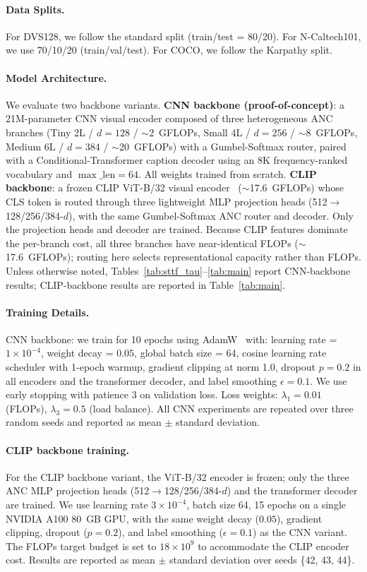 \documentclass{article}
\begin{document}
\paragraph{Data Splits.}
For DVS128, we follow the standard split (train/test = 80/20).
For N-Caltech101, we use 70/10/20 (train/val/test).
For COCO, we follow the Karpathy split.

\paragraph{Model Architecture.}
We evaluate two backbone variants.
\textbf{CNN backbone (proof-of-concept)}: a 21M-parameter CNN visual encoder composed of three heterogeneous ANC branches (Tiny 2L / $d{=}128$ / $\sim$2~GFLOPs, Small 4L / $d{=}256$ / $\sim$8~GFLOPs, Medium 6L / $d{=}384$ / $\sim$20~GFLOPs) with a Gumbel-Softmax router, paired with a Conditional-Transformer caption decoder using an 8K frequency-ranked vocabulary and $\max\_{\text{len}}{=}64$. All weights trained from scratch.
\textbf{CLIP backbone}: a frozen CLIP ViT-B/32 visual encoder~\cite{radford2021clip} ($\sim$17.6~GFLOPs) whose CLS token is routed through three lightweight MLP projection heads (512$\to$128/256/384-$d$), with the same Gumbel-Softmax ANC router and decoder. Only the projection heads and decoder are trained. Because CLIP features dominate the per-branch cost, all three branches have near-identical FLOPs ($\sim$17.6~GFLOPs); routing here selects representational capacity rather than FLOPs. Unless otherwise noted, Tables~\ref{tab:sttf_tau}--\ref{tab:main} report CNN-backbone results; CLIP-backbone results are reported in Table~\ref{tab:main}.

\paragraph{Training Details.}
CNN backbone: we train for 10 epochs using AdamW~\cite{loshchilov2019adamw} with:
learning rate = $1 \times 10^{-4}$,
weight decay = $0.05$,
global batch size = 64,
cosine learning rate scheduler with 1-epoch warmup,
gradient clipping at norm 1.0,
dropout $p=0.2$ in all encoders and the transformer decoder,
and label smoothing $\epsilon=0.1$.
We use early stopping with patience 3 on validation loss.
Loss weights: $\lambda_1=0.01$ (FLOPs), $\lambda_3=0.5$ (load balance).
All CNN experiments are repeated over three random seeds and reported as mean $\pm$ standard deviation.

\paragraph{CLIP backbone training.}
For the CLIP backbone variant, the ViT-B/32 encoder is frozen; only the three ANC MLP projection heads (512$\to$128/256/384-$d$) and the transformer decoder are trained. We use learning rate $3\times10^{-4}$, batch size 64, 15 epochs on a single NVIDIA A100 80~GB GPU, with the same weight decay ($0.05$), gradient clipping, dropout ($p=0.2$), and label smoothing ($\epsilon=0.1$) as the CNN variant. The FLOPs target budget is set to $18\times10^{9}$ to accommodate the CLIP encoder cost. Results are reported as mean $\pm$ standard deviation over seeds \{42, 43, 44\}.
\end{document}

